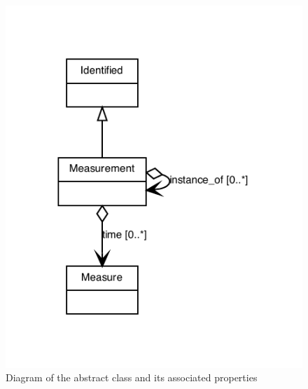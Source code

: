 \begin{figure}[ht]
\begin{center}
\includegraphics[scale=0.8]{figures/Measurement}
\caption[]{Diagram of the  abstract class and its associated properties}
\label{uml:Measurement}
\end{center}
\end{figure}











